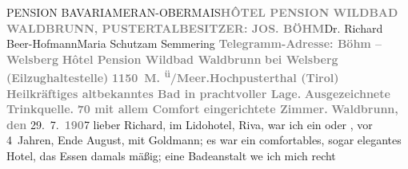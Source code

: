 \begin{ledgroupsized}[t]{13cm}
{{                           PENSION BAVARIAMERAN-OBERMAIS}}\pend{}\pstart{}\textcolor{gray}{\textbf{HÔTEL {\kaufmannsund} PENSION WILDBAD WALDBRUNN, PUSTERTAL}}\pend{}\pstart{}\textcolor{gray}{\textbf{BESITZER: JOS. BÖHM}}\pend{}{\bigskip}\pstart{}Dr. Richard Beer-Hofmann\pend{}\pstart{}Maria Schutz\pend{}\pstart{}am Semmering\pend{}{\bigskip}\pstart
           \noindent{}{\pb}\textcolor{gray}{\textbf{Telegramm-Adresse: Böhm – Welsberg}}\pend
           \pstart
           \textcolor{gray}{\textbf{Hôtel {\kaufmannsund} Pension Wildbad Waldbrunn}}\pend
           \pstart
           \textcolor{gray}{\textbf{bei Welsberg
                     (Eilzughaltestelle)}}\pend
           \pstart
           \textcolor{gray}{\textbf{1150 M. \textsuperscript{ü}/Meer.\hspace*{1.5em}Hochpusterthal (Tirol)}}\pend
           \pstart
           \textcolor{gray}{\textbf{Heilkräftiges altbekanntes Bad in prachtvoller Lage.}}\pend
           \pstart
           \textcolor{gray}{\textbf{Ausgezeichnete Trinkquelle.}}\pend
           \pstart
           \textcolor{gray}{\textbf{70 mit allem Comfort eingerichtete Zimmer.}}\pend
           \pstart
           \raggedleft{}\textcolor{gray}{\textbf{Waldbrunn, den}}{ }29. 7. \textcolor{gray}{\textbf{190}}7\pend
           \pstart{}lieber Richard,\pend\pstart
           im Lidohotel, Riva, war ich ein oder \label{K_L01695-1v}\label{K_L01695-1h}, vor 4 Jahren, Ende August, mit Goldmann; es war ein comfortables, sogar elegantes Hotel, das
               Essen damals mäßig; eine Badeanstalt we{\geminationn} ich mich recht

\end{ledgroupsized}
